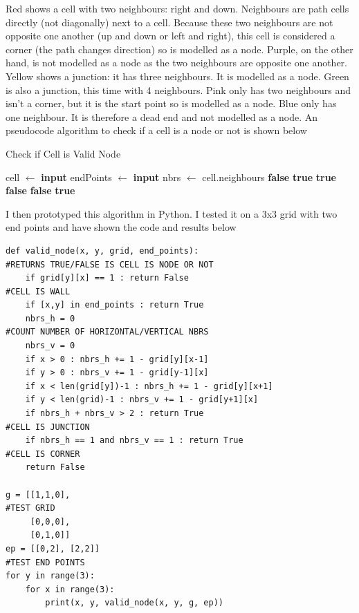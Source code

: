\documentclass[titlepage]{article}
\begin{document}
Red shows a cell with two neighbours: right and down. Neighbours are path cells directly (not diagonally) next to a cell. Because these two neighbours are not opposite one another (up and down or left and right), this cell is considered a corner (the path changes direction) so is modelled as a node. Purple, on the other hand, is not modelled as a node as the two neighbours are opposite one another. Yellow shows a junction: it has three neighbours. It is modelled as a node. Green is also a junction, this time with 4 neighbours. Pink only has two neighbours and isn't a corner, but it is the start point so is modelled as a node. Blue only has one neighbour. It is therefore a dead end and not modelled as a node. An pseudocode algorithm to check if a cell is a node or not is shown below

\begin{algorithm}[H]
\caption{Check if Cell is Valid Node}
\begin{algorithmic}[1]
    	\State cell $\gets$ \textbf{input}
    	\State endPoints $\gets$ \textbf{input}
    	\State nbrs $\gets$ cell.neighbours
		\State \Return \textbf{false}
		\State \Return \textbf{true}
		\State \Return \textbf{true}
		\State \Return \textbf{false}
		\State \Return \textbf{false}
	\EndIf
	\State \Return \textbf{true}
\end{algorithmic}
\end{algorithm}

I then prototyped this algorithm in Python. I tested it on a 3x3 grid with two end points and have shown the code and results below

\begin{changemargin}{-1in}{-1in} 
\begin{verbatim}
def valid_node(x, y, grid, end_points):                                         #RETURNS TRUE/FALSE IS CELL IS NODE OR NOT
    if grid[y][x] == 1 : return False                                           #CELL IS WALL
    if [x,y] in end_points : return True
    nbrs_h = 0                                                                  #COUNT NUMBER OF HORIZONTAL/VERTICAL NBRS
    nbrs_v = 0
    if x > 0 : nbrs_h += 1 - grid[y][x-1]
    if y > 0 : nbrs_v += 1 - grid[y-1][x]
    if x < len(grid[y])-1 : nbrs_h += 1 - grid[y][x+1]
    if y < len(grid)-1 : nbrs_v += 1 - grid[y+1][x]
    if nbrs_h + nbrs_v > 2 : return True                                        #CELL IS JUNCTION
    if nbrs_h == 1 and nbrs_v == 1 : return True                                #CELL IS CORNER
    return False
    
g = [[1,1,0],                                                                   #TEST GRID
     [0,0,0],
     [0,1,0]]
ep = [[0,2], [2,2]]                                                             #TEST END POINTS
for y in range(3):  
    for x in range(3):
        print(x, y, valid_node(x, y, g, ep))
\end{verbatim}
\end{changemargin} 
\end{document}
